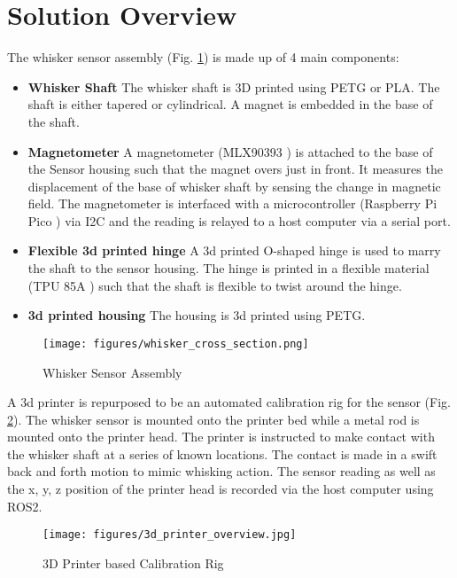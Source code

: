 \documentclass[runningheads]{llncs}
\begin{document}
\section{Solution Overview}

The whisker sensor assembly (Fig. \ref{fig:whisker_sensor_cross_section}) is made up of 4 main components:
\begin{itemize}
    \item \textbf{Whisker Shaft} The whisker shaft is 3D printed using PETG or PLA. The shaft is either tapered or cylindrical. A magnet is embedded in the base of the shaft.
    \item \textbf{Magnetometer} A magnetometer (MLX90393 \cite{industriesAdafruitWideRangeTripleaxis}) is attached to the base of the Sensor housing such that the magnet overs just in front. It measures the displacement of the base of whisker shaft by sensing the change in magnetic field. The magnetometer is interfaced with a microcontroller (Raspberry Pi Pico \cite{ltdBuyRaspberryPi}) via I2C and the reading is relayed to a host computer via a serial port.
    \item \textbf{Flexible 3d printed hinge} A 3d printed O-shaped hinge is used to marry the shaft to the sensor housing. The hinge is printed in a flexible material (TPU 85A \cite{NinjaFlex85ATPU}) such that the shaft is flexible to twist around the hinge.
    \item \textbf{3d printed housing} The housing is 3d printed using PETG.
\end{itemize}

\begin{figure}[H]
    \centering
    \texttt{[image: figures/whisker\_cross\_section.png]}
    \caption{Whisker Sensor Assembly}
    \label{fig:whisker_sensor_cross_section}
\end{figure}

A 3d printer is repurposed to be an automated calibration rig for the sensor (Fig. \ref{fig:calibration_rig}). The whisker sensor is mounted onto the printer bed while a metal rod is mounted onto the printer head. The printer is instructed to make contact with the whisker shaft at a series of known locations. The contact is made in a swift back and forth motion to mimic whisking action. The sensor reading as well as the x, y, z position of the printer head is recorded via the host computer using ROS2.

\begin{figure}[H]
    \centering
    \texttt{[image: figures/3d\_printer\_overview.jpg]}
    \caption{3D Printer based Calibration Rig}
    \label{fig:calibration_rig}
\end{figure}
\end{document}
